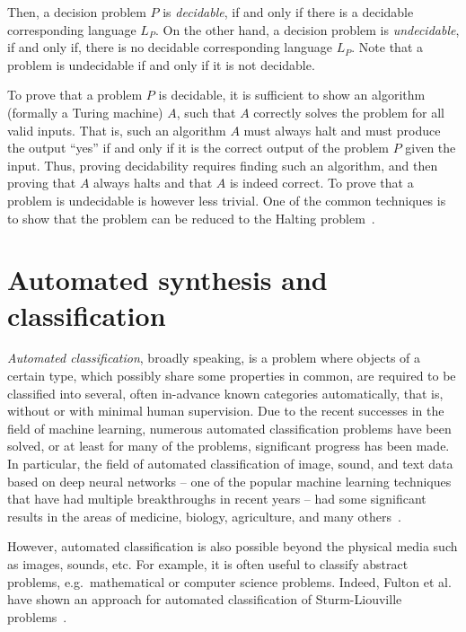 Then, a decision problem $P$ is \emph{decidable}, if and only if
there is a decidable corresponding language $L_P$.
On the other hand, a decision problem is \emph{undecidable},
if and only if, there is no decidable corresponding language $L_P$.
Note that a problem is undecidable if and only if it is not
decidable.

To prove that a problem $P$ is decidable, it is sufficient to
show an algorithm (formally a Turing machine) $A$, such that
$A$ correctly solves the problem for all valid inputs. That is,
such an algorithm $A$ must always halt and must produce the
output ``yes'' if and only if it is the correct output of the
problem $P$ given the input. Thus, proving decidability
requires finding such an algorithm, and then proving
that $A$ always halts and that $A$ is indeed correct.
To prove that a problem is undecidable is however less
trivial. One of the common techniques is to show that
the problem can be reduced to the Halting problem~\cite{Margenstern2000, Turing1937}.

\section{Automated synthesis and classification}

\emph{Automated classification}, broadly speaking, is a problem
where objects of a certain type, which possibly share some
properties in common, are required to be classified into
several, often in-advance known categories automatically,
that is, without or with minimal human supervision.
Due to the recent successes in the field of machine learning,
numerous automated classification problems have been solved,
or at least for many of the problems, significant
progress has been made. In particular, the field of automated classification
of image, sound, and text data
based on deep neural networks -- one of the popular machine learning
techniques that have had multiple breakthroughs in recent years --
had some significant results in the areas of medicine, biology,
agriculture, and many others~\cite{auto-class_Sharma2017,
auto-class_Capizzi2015, auto-class_Ibrahim2018, auto-class_Colonna2016,
auto-class_Winkler2017, auto-class_FabioDelFrate}.

However, automated classification is also possible beyond
the physical media such as images, sounds, etc. For example,
it is often useful to classify abstract problems, e.g.\ mathematical
or computer science problems. Indeed,
Fulton et al.~\cite{class_Fulton} have shown an approach
for automated classification of Sturm-Liouville
problems~\cite{zettl2010sturm}.

